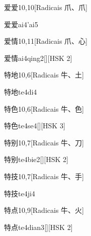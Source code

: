\begin{entry}{爱爱}{10,10}[Radicais ⽖、⽖]
  \begin{phonetics}{爱爱}{ai4'ai5}
  \end{phonetics}
\end{entry}

\begin{entry}{爱情}{10,11}[Radicais ⽖、⼼]
  \begin{phonetics}{爱情}{ai4qing2}[][HSK 2]
  \end{phonetics}
\end{entry}

\begin{entry}{特地}{10,6}[Radicais ⽜、⼟]
  \begin{phonetics}{特地}{te4di4}
  \end{phonetics}
\end{entry}

\begin{entry}{特色}{10,6}[Radicais ⽜、⾊]
  \begin{phonetics}{特色}{te4se4}[][HSK 3]
  \end{phonetics}
\end{entry}

\begin{entry}{特别}{10,7}[Radicais ⽜、⼑]
  \begin{phonetics}{特别}{te4bie2}[][HSK 2]
  \end{phonetics}
\end{entry}

\begin{entry}{特技}{10,7}[Radicais ⽜、⼿]
  \begin{phonetics}{特技}{te4ji4}
  \end{phonetics}
\end{entry}

\begin{entry}{特点}{10,9}[Radicais ⽜、⽕]
  \begin{phonetics}{特点}{te4dian3}[][HSK 2]
  \end{phonetics}
\end{entry}

